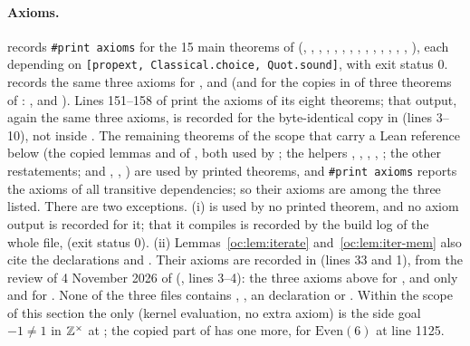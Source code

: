 \paragraph{Axioms.}  records \texttt{\#print axioms} for the 15 main
theorems of  (, ,
, , , ,
, , ,
, , ,
, , ),
each depending on \texttt{[propext, Classical.choice, Quot.sound]}, with exit status 0.
 records the same three axioms for
,
 and
 (and for the copies in  of
three theorems of : ,
 and ). Lines 151--158 of  print
the axioms of its eight theorems; that output, again the same three axioms, is recorded for the
byte-identical copy in  (lines 3--10), not inside . The
remaining theorems of the scope that carry a Lean reference below (the copied lemmas
 and  of , both used by
; the helpers , ,
, , ; the other
 restatements; and ,
, ) are used by printed theorems,
and \texttt{\#print axioms} reports the axioms of all transitive dependencies; so their axioms are among
the three listed. There are two exceptions. (i)  is used by no printed
theorem, and no axiom output is recorded for it; that it compiles is recorded by the build log of the
whole file,  (exit status 0). (ii) Lemmas~\ref{oc:lem:iterate}
and~\ref{oc:lem:iter-mem} also cite the  declarations
 and . Their
axioms are recorded in  (lines 33 and 1), from the review of 4 November
2026 of  (, lines 3--4): the three axioms
above for , and only  and  for
. None of the three files contains , , an 
declaration or . Within the scope of this section the only  (kernel
evaluation, no extra axiom) is the side goal $-1\ne1$ in $\mathbb Z^\times$ at
; the copied part of  has one more, for
$\mathrm{Even}(6)$ at line 1125.

